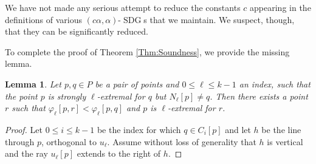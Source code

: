 \documentclass[letter,11pt]{article}
\newtheorem{lemma}[theorem]{Lemma}
\def\SDG{\mathop{\mathrm{SDG}}}
\begin{document}
 We have not made any serious attempt to reduce the constants $c$ appearing in the definitions of various $(c\alpha,\alpha)$-$\SDG$s that we maintain. We suspect, though, that they can be significantly reduced.

To complete the proof of Theorem \ref{Thm:Soundness}, we provide the missing lemma.


\begin{lemma}\label{Lemma:qExtremal}
Let $p,q\in P$ be a pair of points and $0\leq \ell \leq k-1$ an index,
such that the point $p$ is strongly $\ell$-extremal for $q$ but
$N_\ell[p]\neq q$.
Then there exists a point $r$ such that $\varphi_\ell[p,r] < \varphi_\ell[p,q]$ and
 $p$ is $\ell$-extremal
for  $r$.
\end{lemma}

\begin{proof}

Let $0\leq i\leq k-1$ be the index for which $q\in C_i[p]$ and let
$h$ be the 
line through $p$, orthogonal to $u_\ell$.
Assume without loss of generality that $h$ is vertical and
the ray $u_\ell[p]$ extends to the right of $h$.



\end{proof}
\end{document}
